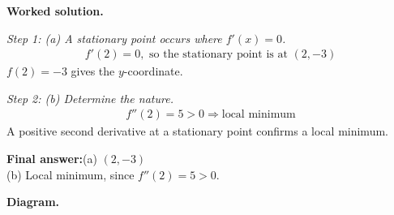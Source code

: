 \documentclass[11pt]{article}
\begin{document}
\textbf{Worked solution.}

\textit{Step 1: (a) A stationary point occurs where \( f'(x) = 0 \).}
\[\begin{gathered}
f'(2) = 0, \text{ so the stationary point is at } (2, -3)
\end{gathered}\]
\( f(2) = -3 \) gives the \( y \)-coordinate.

\textit{Step 2: (b) Determine the nature.}
\[\begin{gathered}
f''(2) = 5 > 0 \Rightarrow \text{local minimum}
\end{gathered}\]
A positive second derivative at a stationary point confirms a local minimum.

\begin{answerbox}
\textbf{Final answer:}\quad (a) \(\displaystyle  (2, -3) \) \\[3pt]  (b) Local minimum, since \(\displaystyle  f''(2) = 5 > 0 \).
\end{answerbox}
\textbf{Diagram.}
\end{document}

